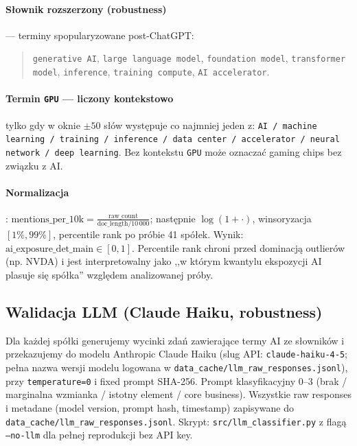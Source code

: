 \documentclass[11pt,a4paper]{article}
\begin{document}
\paragraph{Słownik rozszerzony (robustness)} --- terminy spopularyzowane post-ChatGPT:
\begin{quote}\small
\texttt{generative AI}, \texttt{large language model}, \texttt{foundation model},
\texttt{transformer model}, \texttt{inference}, \texttt{training compute},
\texttt{AI accelerator}.
\end{quote}

\paragraph{Termin \texttt{GPU} --- liczony kontekstowo} tylko gdy w oknie $\pm 50$ słów
występuje co najmniej jeden z: \texttt{AI / machine learning / training /
inference / data center / accelerator / neural network / deep learning}.
Bez kontekstu \texttt{GPU} może oznaczać gaming chips bez związku z AI.

\paragraph{Normalizacja}: $\text{mentions\_per\_10k} = \frac{\text{raw\_count}}
{\text{doc\_length} / 10\,000}$; następnie $\log(1+\cdot)$, winsoryzacja $[1\%, 99\%]$,
percentile rank po próbie 41 spółek. Wynik: $\text{ai\_exposure\_det\_main} \in [0, 1]$.
Percentile rank chroni przed dominacją outlierów (np. NVDA) i jest interpretowalny
jako ,,w którym kwantylu ekspozycji AI plasuje się spółka'' względem analizowanej
próby.

\subsection{Walidacja LLM (Claude Haiku, robustness)}
Dla każdej spółki generujemy wycinki zdań zawierające termy AI ze słowników
i przekazujemy do modelu Anthropic Claude Haiku (slug API: \texttt{claude-haiku-4-5};
pełna nazwa wersji modelu logowana w \texttt{data\_cache/llm\_raw\_responses.jsonl}),
przy \texttt{temperature=0} i fixed prompt SHA-256.
Prompt klasyfikacyjny 0--3 (brak / marginalna wzmianka / istotny element /
core business). Wszystkie raw responses i metadane (model version, prompt hash,
timestamp) zapisywane do \texttt{data\_cache/llm\_raw\_responses.jsonl}.
Skrypt: \texttt{src/llm\_classifier.py} z flagą \texttt{--no-llm} dla pełnej
reprodukcji bez API key.
\end{document}
